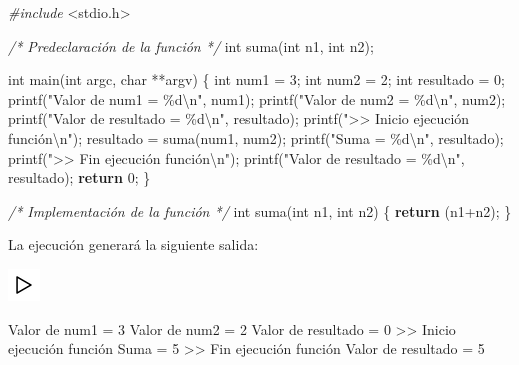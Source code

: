 \documentclass[
]{book}
\newenvironment{Shaded}{\begin{snugshade}}{\end{snugshade}}
\newcommand{\CommentTok}[1]{\textcolor[rgb]{0.56,0.35,0.01}{\textit{#1}}}
\newcommand{\ControlFlowTok}[1]{\textcolor[rgb]{0.13,0.29,0.53}{\textbf{#1}}}
\newcommand{\DataTypeTok}[1]{\textcolor[rgb]{0.13,0.29,0.53}{#1}}
\newcommand{\DecValTok}[1]{\textcolor[rgb]{0.00,0.00,0.81}{#1}}
\newcommand{\ImportTok}[1]{#1}
\newcommand{\NormalTok}[1]{#1}
\newcommand{\PreprocessorTok}[1]{\textcolor[rgb]{0.56,0.35,0.01}{\textit{#1}}}
\newcommand{\SpecialCharTok}[1]{\textcolor[rgb]{0.00,0.00,0.00}{#1}}
\newcommand{\StringTok}[1]{\textcolor[rgb]{0.31,0.60,0.02}{#1}}
\begin{document}
\begin{Shaded}
\begin{Highlighting}[]
\PreprocessorTok{\#include }\ImportTok{\textless{}stdio.h\textgreater{}}

\CommentTok{/* Predeclaración de la función */}
\DataTypeTok{int}\NormalTok{ suma(}\DataTypeTok{int}\NormalTok{ n1, }\DataTypeTok{int}\NormalTok{ n2);}

\DataTypeTok{int}\NormalTok{ main(}\DataTypeTok{int}\NormalTok{ argc, }\DataTypeTok{char}\NormalTok{ **argv) \{}
    \DataTypeTok{int}\NormalTok{ num1 = }\DecValTok{3}\NormalTok{;}
    \DataTypeTok{int}\NormalTok{ num2 = }\DecValTok{2}\NormalTok{;}
    \DataTypeTok{int}\NormalTok{ resultado = }\DecValTok{0}\NormalTok{;}
\NormalTok{    printf(}\StringTok{"Valor de num1 = \%d}\SpecialCharTok{\textbackslash{}n}\StringTok{"}\NormalTok{, num1);}
\NormalTok{    printf(}\StringTok{"Valor de num2 = \%d}\SpecialCharTok{\textbackslash{}n}\StringTok{"}\NormalTok{, num2);}
\NormalTok{    printf(}\StringTok{"Valor de resultado = \%d}\SpecialCharTok{\textbackslash{}n}\StringTok{"}\NormalTok{, resultado);}
\NormalTok{    printf(}\StringTok{"\textgreater{}\textgreater{} Inicio ejecución función}\SpecialCharTok{\textbackslash{}n}\StringTok{"}\NormalTok{);}
\NormalTok{    resultado = suma(num1, num2);}
\NormalTok{    printf(}\StringTok{"Suma = \%d}\SpecialCharTok{\textbackslash{}n}\StringTok{"}\NormalTok{, resultado);}
\NormalTok{    printf(}\StringTok{"\textgreater{}\textgreater{} Fin ejecución función}\SpecialCharTok{\textbackslash{}n}\StringTok{"}\NormalTok{);}
\NormalTok{    printf(}\StringTok{"Valor de resultado = \%d}\SpecialCharTok{\textbackslash{}n}\StringTok{"}\NormalTok{, resultado);}
    \ControlFlowTok{return} \DecValTok{0}\NormalTok{;}
\NormalTok{\}}

\CommentTok{/* Implementación de la función */}
\DataTypeTok{int}\NormalTok{ suma(}\DataTypeTok{int}\NormalTok{ n1, }\DataTypeTok{int}\NormalTok{ n2) \{}
    \ControlFlowTok{return}\NormalTok{ (n1+n2);}
\NormalTok{\}}
\end{Highlighting}
\end{Shaded}

La ejecución generará la siguiente salida:

\includegraphics{./img/play.png}

\begin{Shaded}
\begin{Highlighting}[]
\NormalTok{Valor de num1 = }\DecValTok{3}
\NormalTok{Valor de num2 = }\DecValTok{2}
\NormalTok{Valor de resultado = }\DecValTok{0}
\NormalTok{\textgreater{}\textgreater{} Inicio ejecución función}
\NormalTok{Suma = }\DecValTok{5}
\NormalTok{\textgreater{}\textgreater{} Fin ejecución función}
\NormalTok{Valor de resultado = }\DecValTok{5}
\end{Highlighting}
\end{Shaded}
\end{document}
